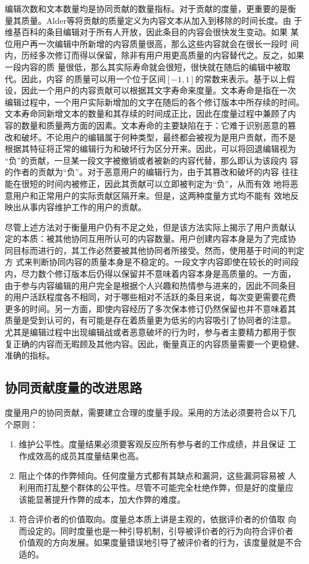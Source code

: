 编辑次数和文本数量均是协同贡献的数量指标。对于贡献的度量，更重要的是衡
量其质量。Alder等将贡献的质量定义为内容文本从加入到移除的时间长度。由
于维基百科的条目编辑对于所有人开放，因此条目的内容会很快发生变动。如果
某位用户再一次编辑中所新增的内容质量很高，那么这些内容就会在很长一段时
间内，历经多次修订而得以保留，除非有用户用更高质量的内容替代之。反之，如果一段内容的质
量很低，那么其实际寿命就会很短，很快就在随后的编辑中被取代。因此，内容
的质量可以用一个位于区间$[-1,1]$的常数来表示。基于以上假
设，因此一个用户的内容贡献可以根据其文字寿命来度量。文本寿命是指在一次
编辑过程中，一个用户实际新增加的文字在随后的各个修订版本中所存续的时间。
文本寿命同新增文本的数量和其存续的时间成正比，因此在度量过程中兼顾了内
容的数量和质量两方面的因素。文本寿命的主要缺陷在于：它难于识别恶意的篡
改和破坏。不论用户的编辑属于何种类型，最终都会被视为是用户贡献，而不是
根据其特征将正常的编辑行为和破坏行为区分开来。因此，可以将回退编辑视为
“负”的贡献，一旦某一段文字被撤销或者被新的内容代替，那么即认为该段内
容的作者的贡献为“负”。对于恶意用户的编辑行为，由于其篡改和破坏的内容
往往能在很短的时间内被修正，因此其贡献可以立即被判定为“负”，从而有效
地将恶意用户和正常用户的实际贡献区隔开来。但是，这两种度量方式均不能有
效地反映出从事内容维护工作的用户的贡献。

尽管上述方法对于衡量用户仍有不足之处，但是该方法实际上揭示了用户贡献认
定的本质：被其他协同互用所认可的内容数量。用户创建内容本身是为了完成协
同目标而进行的，其工作必然要被其他协同者所接受。然而，使用基于时间的判定方
式来判断协同内容的质量本身是不稳定的。一段文字内容即使在较长的时间段
内，尽力数个修订版本后仍得以保留并不意味着内容本身是高质量的。一方面，
由于参与内容编辑的用户完全是根据个人兴趣和热情参与进来的，因此不同条目
的用户活跃程度各不相同，对于哪些相对不活跃的条目来说，每次变更需要花费
更多的时间。另一方面，即使内容经历了多次保本修订仍然保留也并不意味着其
质量是受到认可的，有可能是存在着质量更为低劣的内容吸引了协同者的注意。
尤其是编辑过程中出现编辑战或者恶意破坏的行为时，参与者主要精力都用于恢
复正确的内容而无暇顾及其他内容。因此，衡量真正的内容质量需要一个更稳健、
准确的指标。

\subsection{协同贡献度量的改进思路}
度量用户的协同贡献，需要建立合理的度量手段。采用的方法必须要符合以下几
个原则：

\begin{enumerate}
\item 维护公平性。度量结果必须要客观反应所有参与者的工作成绩，并且保证
  工作成效高的成员其度量结果也高。
\item 阻止个体的作弊倾向。任何度量方式都有其缺点和漏洞，这些漏洞容易被
  人利用而打乱整个群体的公平性。尽管不可能完全杜绝作弊，但是好的度量应
  该能显著提升作弊的成本，加大作弊的难度。
\item 符合评价者的价值取向。度量总本质上讲是主观的，依据评价者的价值取
  向而设定的。同时度量也是一种引导机制，引导被评价者的行为向符合评价者
  价值观的方向发展。如果度量错误地引导了被评价者的行为，该度量就是不合
  适的。
\end{enumerate}

